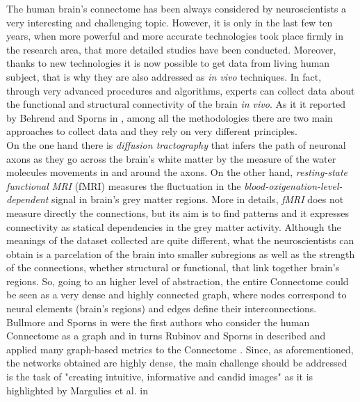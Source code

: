 \documentclass{article}
\begin{document}
\begin{multicols}{2}
The human brain's connectome has been always considered by neuroscientists a very interesting and challenging topic. However, it is only in the last few ten years, when more powerful and more accurate technologies took place firmly in the research area, that more detailed studies have been conducted. Moreover, thanks to new technologies it is now possible to get data from living human subject, that is why they are also addressed as \textit{in vivo} techniques. In fact, through very advanced procedures and algorithms, experts can collect data about the functional and structural connectivity of the brain \textit{in vivo}. As it it reported by Behrend and Sporns in \cite{humanConnectomics}, among all the methodologies there are two main approaches to collect data and they rely on very different principles. \\
On the one hand there is \textit{diffusion tractography} that infers the path of neuronal axons as they go across the brain's white matter by the measure of the water molecules movements in and around the axons. On the other hand, \textit{resting-state functional MRI} (fMRI) measures the fluctuation in the \textit{blood-oxigenation-level-dependent} signal in brain's grey matter regions. More in details, \textit{fMRI} does not measure directly the connections, but its aim is to find patterns and it expresses connectivity as statical dependencies in the grey matter activity. Although the meanings of the dataset collected are quite different, what the neuroscientists can obtain is a parcelation of the brain into smaller subregions as well as the strength of the connections, whether structural or functional, that link together brain's regions. So, going to an higher level of abstraction, the entire Connectome could be seen as a very dense and highly connected graph, where nodes correspond to neural elements (brain's regions) and edges define their interconnections. Bullmore and Sporns in \cite{bullmore2009complex} were the first authors who consider the human Connectome as a graph and in turns Rubinov and Sporns in \cite{complexNetworkMeasures} described and applied many graph-based metrics to the Connectome . Since, as aforementioned, the networks obtained are highly dense, the main challenge should be addressed is the task of "creating intuitive, informative and candid images" as it is highlighted by Margulies et al. in \cite{visualizingHumanConnectome}



\end{multicols}
\end{document}

